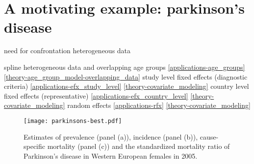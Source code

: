\section{A motivating example: parkinson's disease}
\label{intro-complete_ex}

need for confrontation 
heterogeneous data

spline
heterogeneous data and overlapping age groups \ref{applications-age_groups} \ref{theory-age_group_model-overlapping_data}
study level fixed effects (diagnostic criteria) \ref{applications-efx_study_level} \ref{theory-covariate_modeling}
country level fixed effects (representative) \ref{applications-efx_country_level} \ref{theory-covariate_modeling}
random effects \ref{applications-rfx} \ref{theory-covariate_modeling}


    \begin{figure}[h]
        \begin{center}
            \texttt{[image: parkinsons-best.pdf]}
            \caption{Estimates of prevalence (panel (a)), incidence (panel (b)), cause-specific mortality (panel (c)) and the standardized mortality ratio of Parkinson's disease in Western European females in 2005.}
            \label{fig:app-fruit rate type}
        \end{center}
    \end{figure} 